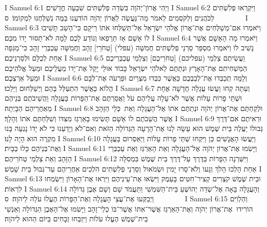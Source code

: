 I Samuel 6:1	וַיְהִי אֲרוֹן־יְהֹוָה בִּשְׂדֵה פְלִשְׁתִּים שִׁבְעָה חֳדָשִׁים׃
I Samuel 6:2	וַיִּקְרְאוּ פְלִשְׁתִּים לַכֹּהֲנִים וְלַקֹּסְמִים לֵאמֹר מַה־נַּעֲשֶׂה לַאֲרוֹן יְהֹוָה הוֹדִעֻנוּ בַּמֶּה נְשַׁלְּחֶנּוּ לִמְקוֹמוֹ׃ {ס}        
I Samuel 6:3	וַיֹּאמְרוּ אִם־מְשַׁלְּחִים אֶת־אֲרוֹן אֱלֹהֵי יִשְׂרָאֵל אַל־תְּשַׁלְּחוּ אֹתוֹ רֵיקָם כִּי־הָשֵׁב תָּשִׁיבוּ לוֹ אָשָׁם אָז תֵּרָפְאוּ וְנוֹדַע לָכֶם לָמָּה לֹא־תָסוּר יָדוֹ מִכֶּם׃
I Samuel 6:4	וַיֹּאמְרוּ מָה הָאָשָׁם אֲשֶׁר נָשִׁיב לוֹ וַיֹּאמְרוּ מִסְפַּר סַרְנֵי פְלִשְׁתִּים חֲמִשָּׁה (עפלי) [טְחֹרֵי] זָהָב וַחֲמִשָּׁה עַכְבְּרֵי זָהָב כִּי־מַגֵּפָה אַחַת לְכֻלָּם וּלְסַרְנֵיכֶם׃
I Samuel 6:5	וַעֲשִׂיתֶם צַלְמֵי (עפליכם) [טְחֹרֵיכֶם] וְצַלְמֵי עַכְבְּרֵיכֶם הַמַּשְׁחִיתִם אֶת־הָאָרֶץ וּנְתַתֶּם לֵאלֹהֵי יִשְׂרָאֵל כָּבוֹד אוּלַי יָקֵל אֶת־יָדוֹ מֵעֲלֵיכֶם וּמֵעַל אֱלֹהֵיכֶם וּמֵעַל אַרְצְכֶם׃
I Samuel 6:6	וְלָמָּה תְכַבְּדוּ אֶת־לְבַבְכֶם כַּאֲשֶׁר כִּבְּדוּ מִצְרַיִם וּפַרְעֹה אֶת־לִבָּם הֲלוֹא כַּאֲשֶׁר הִתְעַלֵּל בָּהֶם וַיְשַׁלְּחוּם וַיֵּלֵכוּ׃
I Samuel 6:7	וְעַתָּה קְחוּ וַעֲשׂוּ עֲגָלָה חֲדָשָׁה אֶחָת וּשְׁתֵּי פָרוֹת עָלוֹת אֲשֶׁר לֹא־עָלָה עֲלֵיהֶם עֹל וַאֲסַרְתֶּם אֶת־הַפָּרוֹת בָּעֲגָלָה וַהֲשֵׁיבֹתֶם בְּנֵיהֶם מֵאַחֲרֵיהֶם הַבָּיְתָה׃
I Samuel 6:8	וּלְקַחְתֶּם אֶת־אֲרוֹן יְהֹוָה וּנְתַתֶּם אֹתוֹ אֶל־הָעֲגָלָה וְאֵת  כְּלֵי הַזָּהָב אֲשֶׁר הֲשֵׁבֹתֶם לוֹ אָשָׁם תָּשִׂימוּ בָאַרְגַּז מִצִּדּוֹ וְשִׁלַּחְתֶּם אֹתוֹ וְהָלָךְ׃
I Samuel 6:9	וּרְאִיתֶם אִם־דֶּרֶךְ גְּבוּלוֹ יַעֲלֶה בֵּית שֶׁמֶשׁ הוּא עָשָׂה לָנוּ אֶת־הָרָעָה הַגְּדוֹלָה הַזֹּאת וְאִם־לֹא וְיָדַעְנוּ כִּי לֹא יָדוֹ נָגְעָה בָּנוּ מִקְרֶה הוּא הָיָה לָנוּ׃
I Samuel 6:10	וַיַּעֲשׂוּ הָאֲנָשִׁים כֵּן וַיִּקְחוּ שְׁתֵּי פָרוֹת עָלוֹת וַיַּאַסְרוּם בָּעֲגָלָה וְאֶת־בְּנֵיהֶם כָּלוּ בַבָּיִת׃
I Samuel 6:11	וַיָּשִׂמוּ אֶת־אֲרוֹן יְהֹוָה אֶל־הָעֲגָלָה וְאֵת הָאַרְגַּז וְאֵת עַכְבְּרֵי הַזָּהָב וְאֵת צַלְמֵי טְחֹרֵיהֶם׃
I Samuel 6:12	וַיִּשַּׁרְנָה הַפָּרוֹת בַּדֶּרֶךְ עַל־דֶּרֶךְ בֵּית שֶׁמֶשׁ בִּמְסִלָּה אַחַת הָלְכוּ הָלֹךְ וְגָעוֹ וְלֹא־סָרוּ יָמִין וּשְׂמֹאול וְסַרְנֵי פְלִשְׁתִּים הֹלְכִים אַחֲרֵיהֶם עַד־גְּבוּל בֵּית שָׁמֶשׁ׃
I Samuel 6:13	וּבֵית שֶׁמֶשׁ קֹצְרִים קְצִיר־חִטִּים בָּעֵמֶק וַיִּשְׂאוּ אֶת־עֵינֵיהֶם וַיִּרְאוּ אֶת־הָאָרוֹן וַיִּשְׂמְחוּ לִרְאוֹת׃
I Samuel 6:14	וְהָעֲגָלָה בָּאָה אֶל־שְׂדֵה יְהוֹשֻׁעַ בֵּית־הַשִּׁמְשִׁי וַתַּעֲמֹד שָׁם וְשָׁם אֶבֶן גְּדוֹלָה וַיְבַקְּעוּ אֶת־עֲצֵי הָעֲגָלָה וְאֶת־הַפָּרוֹת הֶעֱלוּ עֹלָה לַיהֹוָה׃ {ס}        
I Samuel 6:15	וְהַלְוִיִּם הוֹרִידוּ  אֶת־אֲרוֹן יְהֹוָה וְאֶת־הָאַרְגַּז אֲשֶׁר־אִתּוֹ אֲשֶׁר־בּוֹ כְלֵי־זָהָב וַיָּשִׂמוּ אֶל־הָאֶבֶן הַגְּדוֹלָה וְאַנְשֵׁי בֵית־שֶׁמֶשׁ הֶעֱלוּ עֹלוֹת וַיִּזְבְּחוּ זְבָחִים בַּיּוֹם הַהוּא לַיהֹוָה׃
